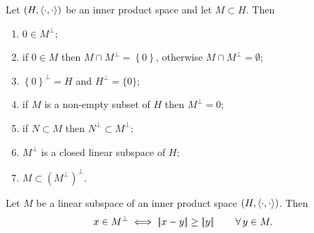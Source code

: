 \documentclass{article}
\begin{document}
\begin{proposition}
	Let $\left(H,\langle \cdot,\cdot \rangle\right)$ be an inner product space and let $M\subset H$. Then
	\begin{enumerate}
		\item $0\in M^{\perp}$;
		\item if $0\in M$ then $M\cap M^{\perp}=\left\{0\right\}$, otherwise $M\cap M^{\perp}=\emptyset$;
		\item $\left\{0\right\}^{\perp}=H$ and $H^{\perp}=\{0\}$;
		\item if $M$ is a non-empty subset of $H$ then $M^{\perp}=0$;
		\item if $N\subset M$ then $N^{\perp}\subset M^{\perp}$;
		\item $M^{\perp}$ is a closed linear subspace of $H$;
		\item $M\subset\left(M^{\perp}\right)^{\perp}$.
	\end{enumerate}
\end{proposition}
\begin{proposition}
	Let $M$ be a linear subspace of an inner product space $\left(H,\langle \cdot,\cdot \rangle\right)$. Then
	\begin{equation*}
		x\in M^{\perp}\iff\left|\negthinspace\left|x-y\right|\negthinspace\right|\geq\left|\negthinspace\left|y\right|\negthinspace\right|\qquad\forall\, y\in M.
	\end{equation*}
\end{proposition}
\end{document}
